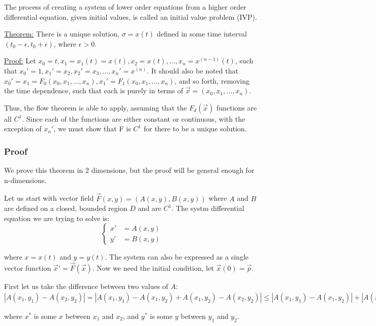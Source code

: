 \documentclass[11 pt, twoside]{article}
\newcommand{\pfrac}[2]{\frac{\partial #1}{\partial #2}}
\begin{document}
The process of creating a system of lower order equations from a higher order differential equation, given initial values, is called an initial value problem (IVP).

\underline{Theorem:} There is a unique solution, $\sigma = x(t)$ defined in some time interval $(t_0 - \epsilon, t_0 + \epsilon)$, where $\epsilon > 0$.

\underline{Proof:}
Let $x_0 = t, x_1 = x_1(t) = x(t), x_2 = x(t), \dots, x_n = x^{(n-1)}(t)$, such that $x_0' = 1, x_1' = x_2, x_2' = x_3, \dots, x_n' = x^{(n)}$. It should also be noted that $x_0' = x_1 = F_0(x_0, x_1, \dots, x_n), x_1' = F_1(x_0, x_1, \dots, x_n)$, and so forth, removing the time dependence, such that each is purely in terms of $\vec{x} = (x_0, x_1, \dots, x_n)$. 

Thus, the flow theorem is able to apply, assuming that the $F_d(\vec{x})$ functions are all $C^1$. Since each of the functions are either constant or continuous, with the exception of $x_n'$, we must show that F is $C^1$ for there to be a unique solution.

\subsubsection{Proof}
We prove this theorem in 2 dimensions, but the proof will be general enough for
n-dimensions.

Let us start with vector field $\vec{F}(x, y) = (A(x, y), B(x, y))$ where $A$
and $B$ are defined on a closed, bounded region $D$ and are $C^1$. The systm
differential equation we are trying to solve is:
\[
\begin{cases}
x' &= A(x, y)\\
y' &= B(x, y)
\end{cases}
\]

where $x = x(t)$ and $y = y(t)$. The system can also be expressed as a single
vector function $\vec{x}' = \vec{F}(\vec{x})$. Now we need the initial
condition, let $\vec{x}(0) = \vec{p}$.

First let us take the difference between two values of $A$:
$|A(x_1, y_1) - A(x_2, y_2)| = |A(x_1, y_1) - A(x_1, y_2) + A(x_1, y_2) - A(x_2, y_2)| \leq |A(x_1, y_1) - A(x_1, y_2)| + |A(x_1, y_2) - A(x_2, y_2)| \leq |\pfrac{A}{y} (x_1, y^*)(y_1 - y_2)| + |\pfrac{A}{x} (x^*, y_2)(x_1 - x_2)|$

where $x^*$ is some $x$ between $x_1$ and $x_2$, and $y^*$ is some $y$ between
$y_1$ and $y_2$.

\end{document}
